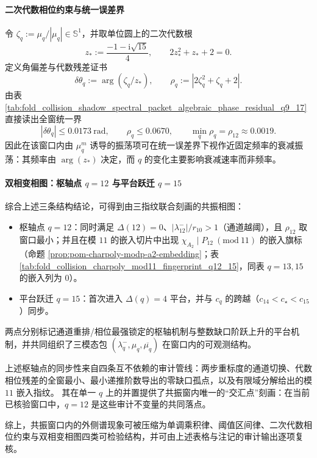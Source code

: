 \begin{remark}
\paragraph{二次代数相位约束与统一误差界}
令 \(\zeta_q:=\mu_q/|\mu_q|\in\mathbb{S}^1\)，并取单位圆上的二次代数根
\[
z_\ast:=\frac{-1-\mathrm{i}\sqrt{15}}{4},
\qquad
2z_\ast^{2}+z_\ast+2=0.
\]
定义角偏差与代数残差证书
\[
\delta\theta_q:=\arg(\zeta_q/z_\ast),
\qquad
\rho_q:=|2\zeta_q^2+\zeta_q+2|.
\]
由表 \ref{tab:fold_collision_shadow_spectral_packet_algebraic_phase_residual_q9_17} 直接读出全窗统一界
\[
|\delta\theta_q|\le 0.0173\ \mathrm{rad},
\qquad
\rho_q\le 0.0670,
\qquad
\min_q\rho_q=\rho_{12}\approx 0.0019.
\]
因此在该窗口内由 \(\mu_q^m\) 诱导的振荡项可在统一误差界下视作近固定频率的衰减振荡：其频率由 \(\arg(z_\ast)\) 决定，而 \(q\) 的变化主要影响衰减速率而非频率。
\par

\paragraph{双相变相图：枢轴点 \(q=12\) 与平台跃迁 \(q=15\)}
综合上述三条结构结论，可得到由三指纹联合刻画的共振相图：
\begin{itemize}
\item 枢轴点 \(q=12\)：同时满足 \(\Delta(12)=0\)、\(|\lambda_{12}^-|/r_{10}>1\)（通道越阈），且 \(\rho_{12}\) 取窗口最小；并且在模 \(11\) 的嵌入切片中出现 \(\chi_{A_2}\mid P_{12}\ (\mathrm{mod}\ 11)\) 的嵌入旗标（命题 \ref{prop:pom-charpoly-modp-a2-embedding}；表 \ref{tab:fold_collision_charpoly_mod11_fingerprint_q12_15}，同表 \(q=13,15\) 的嵌入列为 \(0\)）。
\item 平台跃迁 \(q=15\)：首次进入 \(\Delta(q)=4\) 平台，并与 \(c_q\) 的跨越（\(c_{14}<c_\star<c_{15}\)）同步。
\end{itemize}
两点分别标记通道重排/相位最强锁定的枢轴机制与整数缺口阶跃上升的平台机制，并共同组织了三模态包 \((\lambda_q^-,\mu_q,\overline{\mu_q})\) 在窗口内的可观测结构。
\par
上述枢轴点的同步性来自四条互不依赖的审计管线：两步重标度的通道切换、代数相位残差的全窗最小、最小递推阶数导出的零缺口孤点，以及有限域分解给出的模 \(11\) 嵌入指纹。
其在单一 \(q\) 上的并置提供了共振窗内唯一的“交汇点”刻画：在当前已核验窗口中，\(q=12\) 是这些审计不变量的共同落点。
\par
综上，共振窗口内的外侧谱现象可被压缩为单调乘积律、阈值区间律、二次代数相位约束与双相变相图四类可检验结构，并可由上述表格与注记的审计输出逐项复核。
\end{remark}
